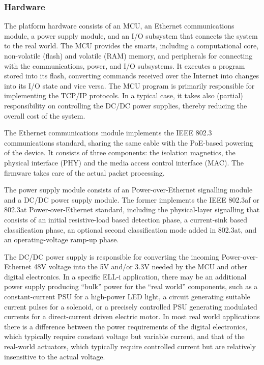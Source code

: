 \documentclass{siamltex}
\begin{document}
\subsubsection{Hardware}

The platform hardware consists of an MCU, an Ethernet
communications module, a power supply module, and an I/O subsystem
that connects the system to the real world.  The MCU provides the
smarts, including a computational core, non-volatile (flash) and
volatile (RAM) memory, and peripherals for connecting with the
communications, power, and I/O subsystems.  It executes a program
stored into its flash, converting commands received over the Internet
into changes into its I/O state and vice versa.  The MCU program is
primarily responsible for implementing the TCP/IP protocols.  In a
typical case, it takes also (partial) responsibility on controlling
the DC/DC power supplies, thereby reducing the overall cost of the
system.

The Ethernet communications module implements the IEEE 802.3~\cite{802.3}
communications standard, sharing the same cable with the PoE-based
powering of the device.  It consists of three components: the
isolation magnetics, the physical interface (PHY) and the media access
control interface (MAC).  The firmware takes care of the actual packet
processing.

The power supply module consists of an Power-over-Ethernet signalling
module and a DC/DC power supply module.  The former implements the
IEEE 802.3af or 802.3at
Power-over-Ethernet standard, including the physical-layer signalling
that consists of an initial resistive-load based detection phase, a
current-sink based classification phase, an optional second
classification mode added in 802.3at, and an operating-voltage ramp-up
phase.  

The DC/DC power supply is responsible for converting the incoming
Power-over-Ethernet 48V voltage into the 5V and/or 3.3V needed by the
MCU and other digital electronics.  In a specific ELL-i application,
there may be an additional power supply producing ``bulk'' power for
the ``real world'' components, such as a constant-current PSU for a
high-power LED light, a circuit generating suitable current pulses for
a solenoid, or a precisely controlled PSU generating modulated
currents for a direct-current driven electric motor.  In most real
world applications there is a difference between the power
requirements of the digital electronics, which typically require
constant voltage but variable current, and that of the real-world
actuators, which typically require controlled current but are
relatively insensitive to the actual voltage.
\end{document}
